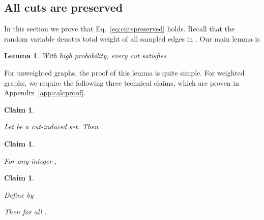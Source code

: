 \documentclass[11pt]{article}
\numberwithin{equation}{section}
\newtheorem{lemma}[theorem]{Lemma}
\newtheorem{claim}[theorem]{Claim}
\newcommand{\Appendix}[1]{Appendix~\ref{app:#1}}
\newcommand{\ClaimName}[1]{\label{clm:#1}}
\newcommand{\Equation}[1]{Eq.~\eqref{eq:#1}}
\newcommand{\LemmaName}[1]{\label{lem:#1}}
\newcommand{\SectionName}[1]{\label{sec:#1}}
\begin{document}
\subsection{All cuts are preserved}
\SectionName{allcuts}

In this section we prove that \Equation{cutspreserved} holds.
Recall that the random variable  denotes total weight of all sampled edges in .
Our main lemma is

\begin{lemma}
\LemmaName{wtderror}
With high probability, every cut  satisfies .
\end{lemma}



For unweighted graphs, the proof of this lemma is quite simple.
For weighted graphs, we require the following three technical claims,
which are proven in \Appendix{calcproof}.


\newcommand{\clmfsmall}{
    Let  be a cut-induced set. Then .
}
\begin{claim}
\ClaimName{Fsmall}
\clmfsmall
\end{claim}


\newcommand{\clmconc}{
    For any integer ,
    
}
\begin{claim}
\ClaimName{concentrate_in_large_Ci}
\clmconc
\end{claim}


\newcommand{\clmginv}{
    Define  by
    
    Then  for all .
}
\begin{claim}
\ClaimName{ginv}
\clmginv
\end{claim}
\end{document}
